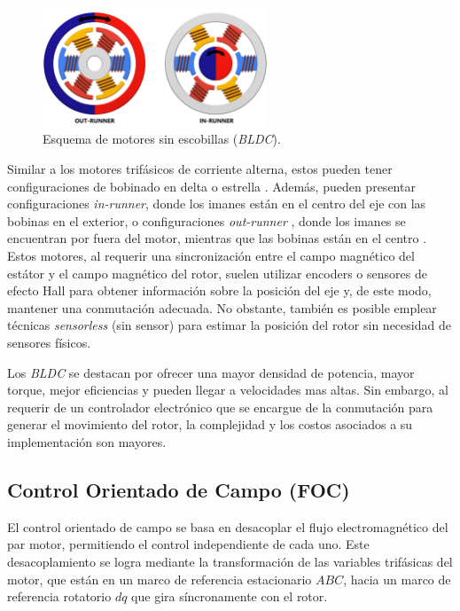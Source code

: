 \documentclass[11pt]{report}
\begin{document}
\begin{figure}[ht]
	\centering
	\includegraphics[width=0.6\textwidth]{imagenes/Motor/OUT_IN_BLDC_SF}
	\caption{Esquema de motores sin escobillas (\textit{BLDC}).}
	\label{fig:motor_sin_escobillas}
\end{figure}
\FloatBarrier

Similar a los motores trifásicos de corriente alterna, estos pueden tener configuraciones de bobinado en delta o estrella \cite{Millet2022}. Además, pueden presentar configuraciones \textit{in-runner}, donde los imanes están en el centro del eje con las bobinas en el exterior, o configuraciones \textit{out-runner} , donde los imanes se encuentran por fuera del motor, mientras que las bobinas están en el centro \cite{9774372}. Estos motores, al requerir una sincronización entre el campo magnético del estátor y el campo magnético del rotor, suelen utilizar encoders o sensores de efecto Hall para obtener información sobre la posición del eje y, de este modo, mantener una conmutación adecuada. No obstante, también es posible emplear técnicas \textit{sensorless} (sin sensor) para estimar la posición del rotor sin necesidad de sensores físicos. \cite{Gualtieri2018_STEP}

Los \textit{BLDC} se destacan por ofrecer una mayor densidad de potencia, mayor torque, mejor eficiencias y pueden llegar a velocidades mas altas. Sin embargo, al requerir de un controlador electrónico que se encargue de la conmutación para generar el movimiento del rotor, la complejidad y los costos asociados a su implementación son mayores. \cite{AN885}

\newpage
\subsection{Control Orientado de Campo (FOC)}
El control orientado de campo se basa en desacoplar el flujo electromagnético del par motor, permitiendo el control independiente de cada uno. Este desacoplamiento se logra mediante la transformación de las variables trifásicas del motor, que están en un marco de referencia estacionario \(ABC\), hacia un marco de referencia rotatorio \(dq\) que gira síncronamente con el rotor. \cite{power_conv_14}
\end{document}

